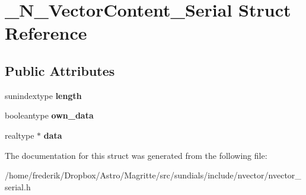 \hypertarget{struct__N__VectorContent__Serial}{}\section{\+\_\+\+N\+\_\+\+Vector\+Content\+\_\+\+Serial Struct Reference}
\label{struct__N__VectorContent__Serial}
\subsection*{Public Attributes}
\begin{DoxyCompactItemize}
\item 
\mbox{\label{struct__N__VectorContent__Serial_a8b85fb73541a6b1755dddbed0d04c9c8}} 
sunindextype {\bfseries length}
\item 
\mbox{\label{struct__N__VectorContent__Serial_ade86be7abd71af090a988af5c1f85246}} 
booleantype {\bfseries own\+\_\+data}
\item 
\mbox{\label{struct__N__VectorContent__Serial_a754437e7833efdc7977ae1323b862739}} 
realtype $\ast$ {\bfseries data}
\end{DoxyCompactItemize}


The documentation for this struct was generated from the following file\+:\begin{DoxyCompactItemize}
\item 
/home/frederik/\+Dropbox/\+Astro/\+Magritte/src/sundials/include/nvector/nvector\+\_\+serial.\+h\end{DoxyCompactItemize}
